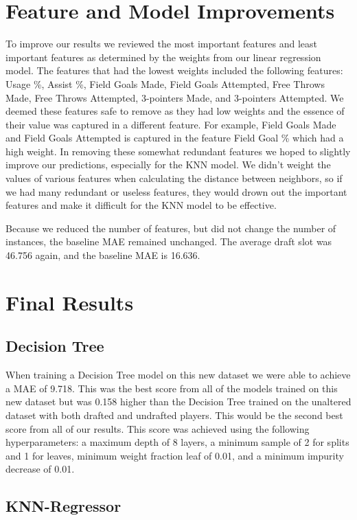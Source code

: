 \documentclass{article}
\begin{document}
\section{Feature and Model Improvements}

To improve our results we reviewed the most important features and least
important features as determined by the weights from our linear regression
model. The features that had the lowest weights included the following features:
Usage \%, Assist \%, Field Goals Made, Field Goals Attempted, Free Throws Made,
Free Throws Attempted, 3-pointers Made, and 3-pointers Attempted. We deemed
these features safe to remove as they had low weights and the essence of their
value was captured in a different feature. For example, Field Goals Made and
Field Goals Attempted is captured in the feature Field Goal \% which had a high
weight. In removing these somewhat redundant features we hoped to slightly
improve our predictions, especially for the KNN model. We didn't weight the
values of various features when calculating the distance between neighbors, so
if we had many redundant or useless features, they would drown out the important
features and make it difficult for the KNN model to be effective.

Because we reduced the number of features, but did not change the number of
instances, the baseline MAE remained unchanged. The average draft slot was
46.756 again, and the baseline MAE is 16.636.

\section{Final Results}

\subsection{Decision Tree}

When training a Decision Tree model on this new dataset we were able to achieve
a MAE of 9.718. This was the best score from all of the models trained on this
new dataset but was 0.158 higher than the Decision Tree trained on the unaltered
dataset with both drafted and undrafted players. This would be the second best
score from all of our results. This score was achieved using the following
hyperparameters: a maximum depth of 8 layers, a minimum sample of 2 for splits
and 1 for leaves, minimum weight fraction leaf of 0.01, and a minimum impurity
decrease of 0.01.

\subsection{KNN-Regressor}
\end{document}
